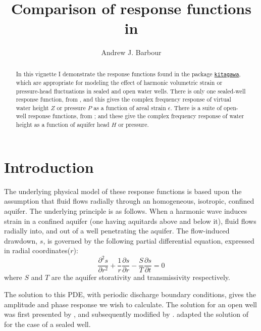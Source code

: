 \documentclass[12pt]{article}\usepackage[]{graphicx}\usepackage[]{color}
\author{Andrew J. Barbour}
\title{Comparison of response functions in \kit{}}
\begin{document}
%
\newcommand{\SC}[1]{\textsc{#1}}
\newcommand{\Rcmd}[1]{\texttt{#1}}
\newcommand{\kit}[0]{\href{http://abarbour.github.io/kitagawa/}{\color{blue}\Rcmd{kitagawa}}}
\newcommand{\bidxa}[1]{\index{#1}{\textbf{#1}}} 
\newcommand{\bidxb}[2]{\index{#2}{\textbf{#1}}} 
\newcommand{\idxa}[1]{\index{#1}{#1}} 
\newcommand{\idxb}[2]{\index{#2}{#1}} 
%
\maketitle
%
\begin{abstract}
In this vignette I demonstrate the response functions found in 
the package
\kit{}, which are appropriate for modeling the effect of
harmonic volumetric strain or pressure-head fluctuations in
sealed and open water wells.
There is only one sealed-well response function, from
\citet{kitagawa2011}, and this gives the complex frequency response of
virtual water height $Z$ or pressure $P$ as a function of
areal %
strain $\epsilon$.
There is a suite of open-well response functions, from 
\citet{cooper1965, hsieh1987, rojstaczer1988, liu1989}; and
these give the complex frequency response of
water height as a function of aquifer head $H$ or pressure.
\end{abstract}
%
\tableofcontents

\clearpage
\section{Introduction}

 The underlying physical model of these response functions
 is based upon the assumption that fluid flows radially
 through an homogeneous, isotropic, confined aquifer.
%
 The underlying principle is as follows.  When a harmonic wave induces
 strain in a confined aquifer (one having aquitards above and below it), 
 fluid flows radially into, and out of a well penetrating the aquifer.
 The flow-induced drawdown, $s$, is governed by the following 
 partial differential equation, expressed in radial coordinates($r$):
\begin{equation}
 \frac{\partial^2 s}{\partial r^2} + \frac{1}{r} 
 \frac{\partial s}{ \partial r} - \frac{S}{T}\frac{\partial s}{\partial t} = 0
\end{equation}
 where $S$ and $T$ are the aquifer storativity and transmissivity respectively.
 
 The solution to this PDE, with periodic discharge boundary conditions,
 gives the amplitude and phase response we wish to calculate.
 The solution  for an open well was first presented by
 \citet{cooper1965}, and subsequently modified by \citet{rojstaczer1988, liu1989}.
 \citet{kitagawa2011} adapted the solution
 of \citet{hsieh1987} for the case of a sealed well.
 
\end{document}
